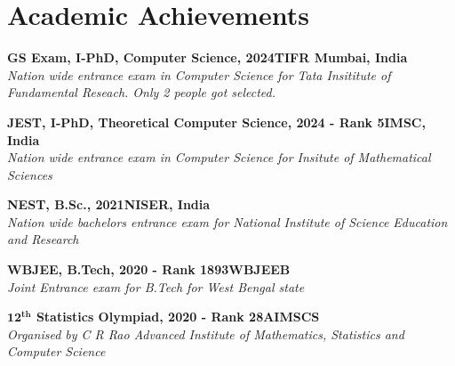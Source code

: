 \documentclass[letterpaper,10pt]{article}
\newcommand{\heading}[2]{
  \hspace{0pt}#1\hfill#2\\
}
\newcommand{\headingBf}[2]{
  \heading{\textbf{#1}}{\textbf{#2}}
}
\newcommand{\headingIt}[2]{
  \heading{\textit{#1}}{\textit{#2}}
}
\newenvironment{resume_list}{
  \vspace{-7pt}
  \begin{itemize}[itemsep=-2px, parsep=1pt, leftmargin=30pt, label={$\circ$}]
}{
  \end{itemize}
}
\begin{document}
\section{Academic Achievements}
\begin{resume_list}
	\item \headingBf{GS Exam, I-PhD, Computer Science, 2024}{TIFR Mumbai, India}
	\headingIt{Nation wide entrance exam in Computer Science for Tata Insititute of Fundamental Reseach. Only 2 people got selected.}{}
	
	\item \headingBf{JEST, I-PhD, Theoretical Computer Science, 2024 - Rank 5}{IMSC, India}
	\headingIt{Nation wide entrance exam in Computer Science for Insitute of Mathematical Sciences}{}
	\item \headingBf{NEST, B.Sc., 2021}{NISER, India}
	\headingIt{Nation wide bachelors entrance exam for National Institute of Science Education and Research }{}
	\item \headingBf{WBJEE, B.Tech, 2020 - Rank 1893}{WBJEEB}
	\headingIt{Joint Entrance exam for B.Tech for West Bengal state}{}
	\item \headingBf{$\boldsymbol{12^{th}}$ Statistics Olympiad, 2020 - Rank 28}{AIMSCS}
	\headingIt{Organised by C R Rao Advanced Institute of Mathematics, Statistics and Computer Science}{}
	
\end{resume_list}
\end{document}
